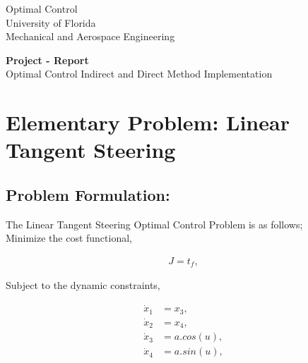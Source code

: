 \documentclass[11pt,usenames]{article}
\title{}
\date{}
\begin{document}
	
	
	
	\begin{center}
		{\sc Optimal Control}\\
		University of Florida \\
		Mechanical and Aerospace Engineering
		\vspace{0.5 cm}
	\end{center}
	
	{\large \begin{center}
			\textbf{Project - Report}\\
			Optimal Control Indirect and Direct Method Implementation
	\end{center}}
	
	
	\newpage
	
	
	\tableofcontents
	
	
	\newpage
	
	
	\section{Elementary Problem: Linear Tangent Steering}
	
	
	\subsection{Problem Formulation:}
	
	The Linear Tangent Steering Optimal Control Problem is as follows;\\
	
	Minimize the cost functional,
	
	\begin{align} 
	J = t_{f},
	\end{align}
	
	Subject to the dynamic constraints,
	
	\begin{align}
	\dot x_{1} &= x_{3}, \nonumber \\
	\dot x_{2} &= x_{4},\\
	\dot x_{3} &= a.cos(u),\nonumber\\
	\dot x_{4} &= a.sin(u), \nonumber
	\end{align}
	
\end{document}
